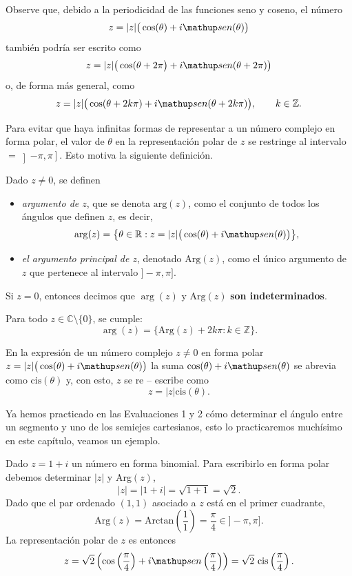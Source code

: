 Observe que, debido a la periodicidad de las funciones
seno y coseno, el n\'umero 
\[
    z = |z| \big(\cos(\theta) + i \sen(\theta)\big)
\]
tambi\'en podr\'ia ser escrito como 
\[
    z = |z| \big(\cos(\theta +2 \pi\big) + i \sen(\theta + 2 \pi)\big)
\]
o, de forma m\'as general, como 
\[
    z = |z| \big(\cos(\theta +2 k \pi) + 
    i \sen(\theta+2 k \pi)\big),\qquad k \in \Z.
\]

Para evitar que haya infinitas formas de representar a un n\'umero complejo
en forma polar, el valor de $\theta$ en la representaci\'on polar
de $z$ se restringe al intervalo $=\left]-\pi,\pi\right]$. 
Esto motiva la siguiente definici\'on.

\medskip 

\begin{defn}{}{}
Dado $z\neq 0$, se definen
\begin{itemize}
\item \textit{argumento de $z$}, que se denota $\text{arg}(z)$, como 
    el conjunto de todos los ángulos que definen $z$, es decir,
    $$\arg(z)=\big\{\theta\in\mathbb{R}:
         z=|z| \big(\cos(\theta)+i \sen(\theta)\big)\big\},$$
\item \textit{el argumento principal de $z$}, 
    denotado $\text{Arg}(z)$, como el \'unico     
    argumento de $z$ que pertenece al intervalo $]-\pi,\pi]$.
\end{itemize}
Si $z=0$, entonces decimos que $\arg(z)$ y $\text{Arg}(z)$ {\bf son indeterminados}.
\end{defn}


\medskip


\begin{prop}
    Para todo $z\in\mathbb{C}\setminus\{0\}$, se cumple:
    $$\arg(z)=\big\{\text{Arg}(z)+2 k \pi: k\in\mathbb{Z}\big\}.$$
\end{prop}

En la expresi\'on de un n\'umero complejo $z \ne 0$ en forma polar $z = |z| \big(\cos(\theta) + i \sen(\theta)\big)$
la suma $\cos(\theta) + i \sen(\theta)$ se abrevia como $\textrm{cis}(\theta)$ y, con esto, $z$ se re -- escribe como
\[
    z = |z| \mbox{cis}(\theta).
\]

Ya hemos practicado en las Evaluaciones 1 y 2 cómo determinar el ángulo entre un segmento y uno de los semiejes cartesianos, esto lo practicaremos muchísimo en este capítulo, veamos un ejemplo.

\begin{ejemplo}{}{}
Dado $z = 1 + i$ un n\'umero en forma binomial. 
            Para escribirlo en forma polar debemos determinar $|z|$ y
            Arg$(z)$,
            $$|z| = |1+i| = \sqrt{1+1} = \sqrt{2}.$$					
            Dado que el par ordenado $(1,1)$ asociado a $z$ 
            est\'a en el primer cuadrante,
            \[
                \mbox{Arg}(z) = \mbox{Arctan}(\frac{1}{1}) = \frac{\pi}{4}\in]-\pi,\pi].
            \]
            La representaci\'on polar de $z$ es entonces
            \[
                z = \sqrt{2}\left(\cos\left(\frac{\pi}{4}\right) + 
                    i \sen\left(\frac{\pi}{4}\right)\right)
                    = \sqrt{2}\ \mbox{cis}\left(\frac{\pi}{4}\right). 
            \]
\end{ejemplo}

